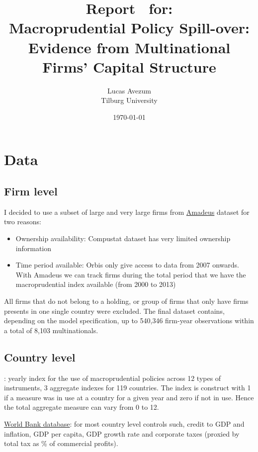 \documentclass[12pt,runningheads]{article}
\begin{document}
\title{Report \ for:\\ \textbf{
   Macroprudential Policy Spill-over: Evidence from Multinational Firms' Capital Structure \large}} 


\author{Lucas Avezum \\
Tilburg University \vspace*{20pt}}
\date{\today }

\maketitle

\section{Data}
\subsection{Firm level}
  I decided to use a subset of large and very large firms from \underline{Amadeus} dataset for two reasons:
 \begin{itemize}
\item Ownership availability: Compustat dataset has very limited ownership information
\item Time period available: Orbis only give access to data from 2007 onwards. With Amadeus we can track firms during the total period that we have the macroprudential index available (from 2000 to 2013)
\end{itemize}
All firms that do not belong to a holding, or group of firms that only have firms presents in one single country were excluded. The final dataset contains, depending on the model specification, up to 540,346 firm-year observations within a total of 8,103 multinationals.  

\subsection{Country level}
\underline{\cite*{cerutti2015use}}: yearly index for the use of macroprudential policies across 12 types of instruments, 3 aggregate indexes for 119 countries. The index is construct with 1 if a measure was in use at a country for a given year and zero if not in use. Hence the total aggregate measure can vary from 0 to 12. 

\underline{World Bank database}: for most country level controls such, credit to GDP and inflation, GDP per capita, GDP growth rate and corporate taxes (proxied by total tax as \% of commercial profits). 
\end{document}
